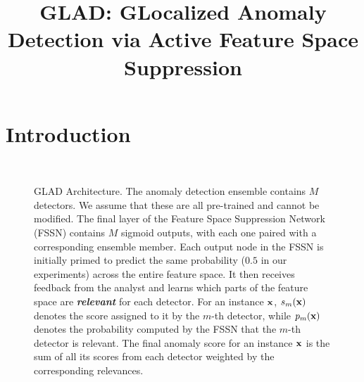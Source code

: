 \documentclass{article}
\title{GLAD: {\bf GL}ocalized {\bf A}nomaly {\bf D}etection via Active Feature Space Suppression}
\begin{document}
\maketitle

\section{Introduction}

\begin{figure}[t]
	\centering
	\captionsetup{labelformat=empty}
	 \\[-1ex]
	\caption{GLAD Architecture. The anomaly detection ensemble contains $M$ detectors. We assume that these are all pre-trained and cannot be modified. The final layer of the Feature Space Suppression Network (FSSN) contains $M$ sigmoid outputs, with each one paired with a corresponding ensemble member. Each output node in the FSSN is initially primed to predict the same probability ($0.5$ in our experiments) across the entire feature space. It then receives feedback from the analyst and learns which parts of the feature space are \textit{\textbf{relevant}} for each detector. For an instance ${\bf x}$, $s_m({\bf x})$ denotes the score assigned to it by the $m$-th detector, while $p_m({\bf x})$ denotes the probability computed by the FSSN that the $m$-th detector is relevant. The final anomaly score for an instance ${\bf x}$ is the sum of all its scores from each detector weighted by the corresponding relevances.}
	\label{fig:architecture}
\end{figure}
\end{document}
